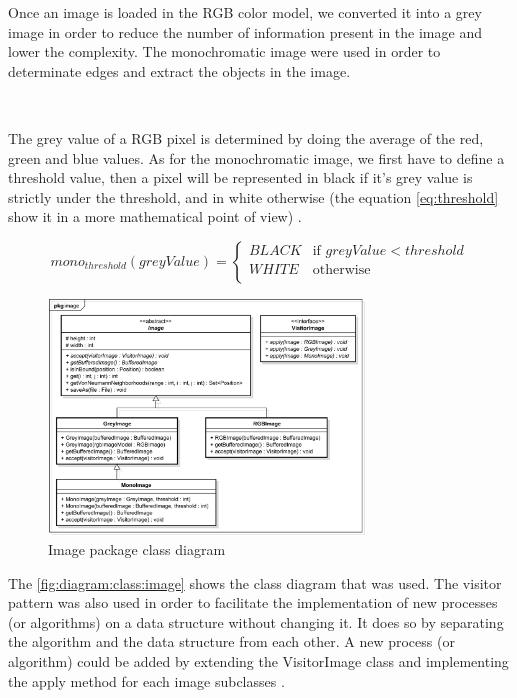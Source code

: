 Once an image is loaded in the RGB color model, we converted it into a grey image in order to reduce the number of information present in the image and lower the complexity. The monochromatic image were used in order to determinate edges and extract the objects in the image.

~~

The grey value of a RGB pixel is determined by doing the average of the red, green and blue values. As for the monochromatic image, we first have to define a 
threshold value, then a pixel will be represented in black if it's grey value is strictly under the threshold, and in white otherwise (the equation \ref{eq:threshold} show it in a more mathematical point of view) \cite{bib:image:Threshold}.

\begin{equation} \label{eq:threshold}
mono_{threshold}(greyValue) = 
	\begin{cases}
		BLACK & \text{if } greyValue < threshold \\
		WHITE & \text{otherwise} \\ 
	\end{cases}
\end{equation}



\begin{figure}
	\centering 
	\includegraphics[width=0.75\textwidth]{images/diagrams/class_diagram_image}
	\caption{Image package class diagram}
	\label{fig:diagram:class:image}
\end{figure}

The \vref{fig:diagram:class:image} shows the class diagram that was used. The visitor pattern was also used in order to facilitate the implementation of new processes (or algorithms) on a data structure without changing it. It does so by separating the algorithm and the data structure from each other. A new process (or algorithm) could be added by extending the VisitorImage class and implementing the apply method for each image subclasses \cite{bib:pattern:Visitor}. 

